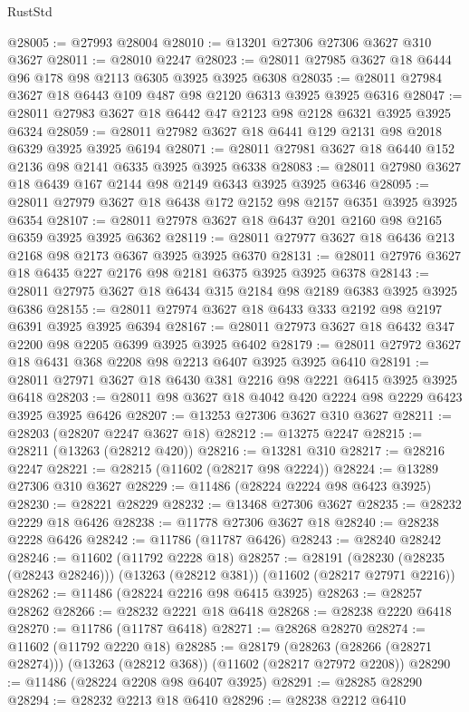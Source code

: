 \begin{lexlean}{RustStd}
\begin{coremodule}
@28005 := @27993 @28004
@28010 := @13201 @27306 @27306 @3627 @310 @3627
@28011 := @28010 @2247
@28023 := @28011 @27985 @3627 @18 @6444 @96 @178 @98 @2113 @6305 @3925 @3925 @6308
@28035 := @28011 @27984 @3627 @18 @6443 @109 @487 @98 @2120 @6313 @3925 @3925 @6316
@28047 := @28011 @27983 @3627 @18 @6442 @47 @2123 @98 @2128 @6321 @3925 @3925 @6324
@28059 := @28011 @27982 @3627 @18 @6441 @129 @2131 @98 @2018 @6329 @3925 @3925 @6194
@28071 := @28011 @27981 @3627 @18 @6440 @152 @2136 @98 @2141 @6335 @3925 @3925 @6338
@28083 := @28011 @27980 @3627 @18 @6439 @167 @2144 @98 @2149 @6343 @3925 @3925 @6346
@28095 := @28011 @27979 @3627 @18 @6438 @172 @2152 @98 @2157 @6351 @3925 @3925 @6354
@28107 := @28011 @27978 @3627 @18 @6437 @201 @2160 @98 @2165 @6359 @3925 @3925 @6362
@28119 := @28011 @27977 @3627 @18 @6436 @213 @2168 @98 @2173 @6367 @3925 @3925 @6370
@28131 := @28011 @27976 @3627 @18 @6435 @227 @2176 @98 @2181 @6375 @3925 @3925 @6378
@28143 := @28011 @27975 @3627 @18 @6434 @315 @2184 @98 @2189 @6383 @3925 @3925 @6386
@28155 := @28011 @27974 @3627 @18 @6433 @333 @2192 @98 @2197 @6391 @3925 @3925 @6394
@28167 := @28011 @27973 @3627 @18 @6432 @347 @2200 @98 @2205 @6399 @3925 @3925 @6402
@28179 := @28011 @27972 @3627 @18 @6431 @368 @2208 @98 @2213 @6407 @3925 @3925 @6410
@28191 := @28011 @27971 @3627 @18 @6430 @381 @2216 @98 @2221 @6415 @3925 @3925 @6418
@28203 := @28011 @98 @3627 @18 @4042 @420 @2224 @98 @2229 @6423 @3925 @3925 @6426
@28207 := @13253 @27306 @3627 @310 @3627
@28211 := @28203 (@28207 @2247 @3627 @18)
@28212 := @13275 @2247
@28215 := @28211 (@13263 (@28212 @420))
@28216 := @13281 @310
@28217 := @28216 @2247
@28221 := @28215 (@11602 (@28217 @98 @2224))
@28224 := @13289 @27306 @310 @3627
@28229 := @11486 (@28224 @2224 @98 @6423 @3925)
@28230 := @28221 @28229
@28232 := @13468 @27306 @3627
@28235 := @28232 @2229 @18 @6426
@28238 := @11778 @27306 @3627 @18
@28240 := @28238 @2228 @6426
@28242 := @11786 (@11787 @6426)
@28243 := @28240 @28242
@28246 := @11602 (@11792 @2228 @18)
@28257 := @28191
    (@28230 (@28235 (@28243 @28246)))
    (@13263 (@28212 @381))
    (@11602 (@28217 @27971 @2216))
@28262 := @11486 (@28224 @2216 @98 @6415 @3925)
@28263 := @28257 @28262
@28266 := @28232 @2221 @18 @6418
@28268 := @28238 @2220 @6418
@28270 := @11786 (@11787 @6418)
@28271 := @28268 @28270
@28274 := @11602 (@11792 @2220 @18)
@28285 := @28179
    (@28263 (@28266 (@28271 @28274)))
    (@13263 (@28212 @368))
    (@11602 (@28217 @27972 @2208))
@28290 := @11486 (@28224 @2208 @98 @6407 @3925)
@28291 := @28285 @28290
@28294 := @28232 @2213 @18 @6410
@28296 := @28238 @2212 @6410

\end{coremodule}
\end{lexlean}
